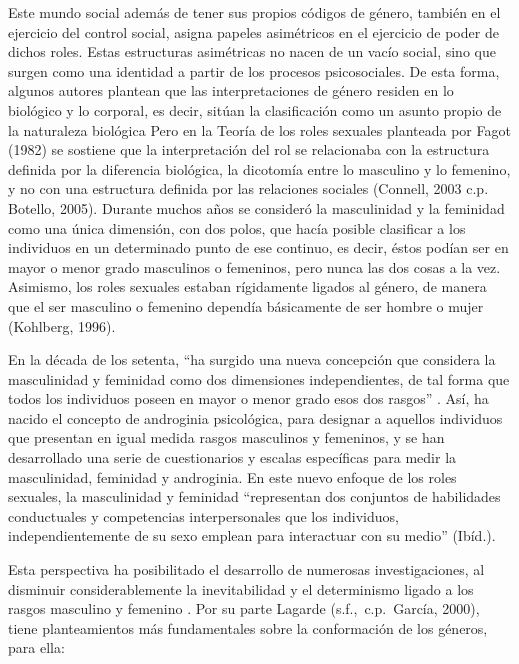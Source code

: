 Este mundo social además de tener sus propios códigos de género, también en el
ejercicio del control social, asigna papeles asimétricos en el ejercicio de
poder de dichos roles.
Estas estructuras asimétricas no nacen de un vacío social, sino que surgen como
una identidad a partir de los procesos psicosociales.
De esta forma, algunos autores plantean que las interpretaciones de género
residen en lo biológico y lo corporal, es decir, sitúan la clasificación como un
asunto propio de la naturaleza biológica
Pero en la Teoría de los roles sexuales planteada por Fagot (1982) se sostiene
que la interpretación del rol se relacionaba con la estructura definida por la
diferencia biológica, la dicotomía entre lo masculino y lo femenino, y no con
una estructura definida por las relaciones sociales (Connell, 2003 c.p.
Botello, 2005).
Durante muchos años se consideró la masculinidad y la feminidad como una única
dimensión, con dos polos, que hacía posible clasificar a los individuos en un
determinado punto de ese continuo, es decir, éstos podían ser en mayor o menor
grado masculinos o femeninos, pero nunca las dos cosas a la vez.
Asimismo, los roles sexuales estaban rígidamente ligados al género, de manera
que el ser masculino o femenino dependía básicamente de ser hombre o mujer
(Kohlberg, 1996).

En la década de los setenta, “ha surgido una nueva concepción que considera
la masculinidad y feminidad como dos dimensiones independientes, de tal forma
que todos los individuos poseen en mayor o menor grado esos dos rasgos”
\parencite[][p. 2]{MoyaMorales1984}.
Así, ha nacido el concepto de androginia psicológica, para designar a aquellos
individuos que presentan en igual medida rasgos masculinos y femeninos, y se han
desarrollado una serie de cuestionarios y escalas específicas para medir la
masculinidad, feminidad y androginia.
En este nuevo enfoque de los roles sexuales, la masculinidad y feminidad
“representan dos conjuntos de habilidades conductuales y competencias
interpersonales que los individuos, independientemente de su sexo emplean para
interactuar con su medio” (Ibíd.).

Esta perspectiva ha posibilitado el desarrollo de numerosas investigaciones, al
disminuir considerablemente la inevitabilidad y el determinismo ligado a los
rasgos masculino y femenino \parencite{MoyaMorales1984}.
Por su parte Lagarde (s.f.,\ c.p.~García, 2000), tiene planteamientos más
fundamentales sobre la conformación de los géneros, para ella:

